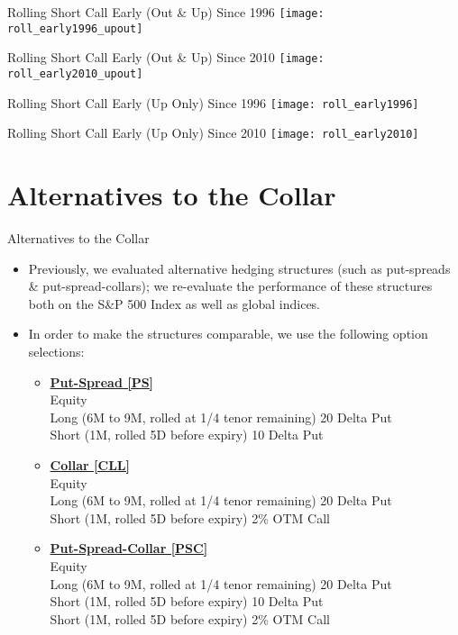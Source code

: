 \documentclass{beamer}
\begin{document}
\begin{frame}{Rolling Short Call Early (Out \& Up) Since 1996}
\texttt{[image: roll\_early1996\_upout]}
\end{frame}

\begin{frame}{Rolling Short Call Early  (Out \& Up) Since 2010}
\texttt{[image: roll\_early2010\_upout]}
\end{frame}

\begin{frame}{Rolling Short Call Early (Up Only) Since 1996}
\texttt{[image: roll\_early1996]}
\end{frame}

\begin{frame}{Rolling Short Call Early (Up Only) Since 2010}
\texttt{[image: roll\_early2010]}
\end{frame}

\section{Alternatives to the Collar}
\begin{frame}{Alternatives to the Collar}
\begin{itemize}
\item Previously, we evaluated alternative hedging structures (such as put-spreads \& put-spread-collars); we re-evaluate the performance of these structures both on the S\&P 500 Index as well as global indices.
\vfill
\item In order to make the structures comparable, we use the following option selections:
\begin{itemize}
\item {\footnotesize \underline {{\bf Put-Spread [PS]}} \\ Equity \\Long (6M to 9M, rolled at 1/4 tenor remaining) 20 Delta Put \\Short (1M, rolled 5D before expiry) 10 Delta Put}
\item {\footnotesize \underline {{\bf Collar [CLL]}} \\ Equity \\Long (6M to 9M, rolled at 1/4 tenor remaining) 20 Delta Put \\Short (1M, rolled 5D before expiry) 2\% OTM Call}
\item {\footnotesize \underline {{\bf Put-Spread-Collar [PSC]}} \\ Equity \\Long (6M to 9M, rolled at 1/4 tenor remaining) 20 Delta Put \\Short (1M, rolled 5D before expiry) 10 Delta Put \\Short (1M, rolled 5D before expiry) 2\% OTM Call}
\end{itemize}
\end{itemize}
\end{frame}
\end{document}
